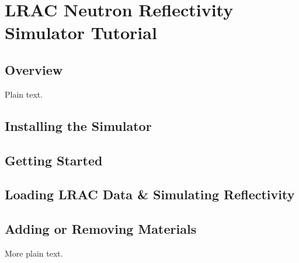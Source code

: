 \documentclass{article}
\begin{document}
\section{LRAC Neutron Reflectivity Simulator Tutorial}

\subsection{Overview}

Plain text.

\subsection{Installing the Simulator}
\subsection{Getting Started}
\subsection{Loading LRAC Data \& Simulating Reflectivity}
\subsection{Adding or Removing Materials}

More plain text.
\end{document}
